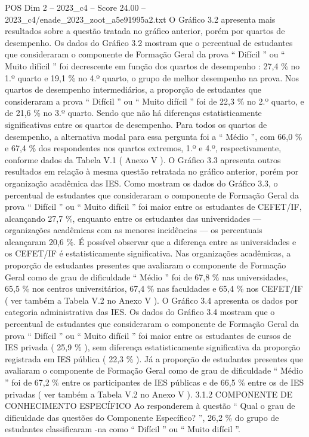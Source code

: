 \begin{textsample}{POS Dim 2 – 2023\_c4 – Score 24.00 – 2023\_c4/enade\_2023\_zoot\_a5e91995a2.txt}
O Gráfico 3.2 apresenta mais resultados sobre a questão tratada no gráfico anterior, porém por quartos de desempenho.
Os dados do Gráfico 3.2 mostram que o percentual de estudantes que consideraram o componente de Formação Geral da prova “ Difícil ” ou “ Muito difícil ” foi decrescente em função dos quartos de desempenho : 27,4 \% no 1.º quarto e 19,1 \% no 4.º quarto, o grupo de melhor desempenho na prova.
Nos quartos de desempenho intermediários, a proporção de estudantes que consideraram a prova “ Difícil ” ou “ Muito difícil ” foi de 22,3 \% no 2.º quarto, e de 21,6 \% no 3.º quarto.
Sendo que não há diferenças estatisticamente significativas entre os quartos de desempenho.
Para todos os quartos de desempenho, a alternativa modal para essa pergunta foi a “ Médio ”, com 66,0 \% e 67,4 \% dos respondentes nos quartos extremos, 1.º e 4.º, respectivamente, conforme dados da Tabela V.1 ( Anexo V ).
O Gráfico 3.3 apresenta outros resultados em relação à mesma questão retratada no gráfico anterior, porém por organização acadêmica das IES.
Como mostram os dados do Gráfico 3.3, o percentual de estudantes que consideraram o componente de Formação Geral da prova “ Difícil ” ou “ Muito difícil ” foi maior entre os estudantes de CEFET/IF, alcançando 27,7 \%, enquanto entre os estudantes das universidades — organizações acadêmicas com as menores incidências — os percentuais alcançaram 20,6 \%.
É possível observar que a diferença entre as universidades e os CEFET/IF é estatisticamente significativa.
Nas organizações acadêmicas, a proporção de estudantes presentes que avaliaram o componente de Formação Geral como de grau de dificuldade “ Médio ” foi de 67,8 \% nas universidades, 65,5 \% nos centros universitários, 67,4 \% nas faculdades e 65,4 \% nos CEFET/IF ( ver também a Tabela V.2 no Anexo V ).
O Gráfico 3.4 apresenta os dados por categoria administrativa das IES.
Os dados do Gráfico 3.4 mostram que o percentual de estudantes que consideraram o componente de Formação Geral da prova “ Difícil ” ou “ Muito difícil ” foi maior entre os estudantes de cursos de IES privada ( 25,9 \% ), sem diferença estatisticamente significativa da proporção registrada em IES pública ( 22,3 \% ).
Já a proporção de estudantes presentes que avaliaram o componente de Formação Geral como de grau de dificuldade “ Médio ” foi de 67,2 \% entre os participantes de IES públicas e de 66,5 \% entre os de IES privadas ( ver também a Tabela V.2 no Anexo V ). 3.1.2 COMPONENTE DE CONHECIMENTO ESPECÍFICO Ao responderem à questão “ Qual o grau de dificuldade das questões do Componente Específico? ”, 26,2 \% do grupo de estudantes classificaram -na como “ Difícil ” ou “ Muito difícil ”.

\end{textsample}
